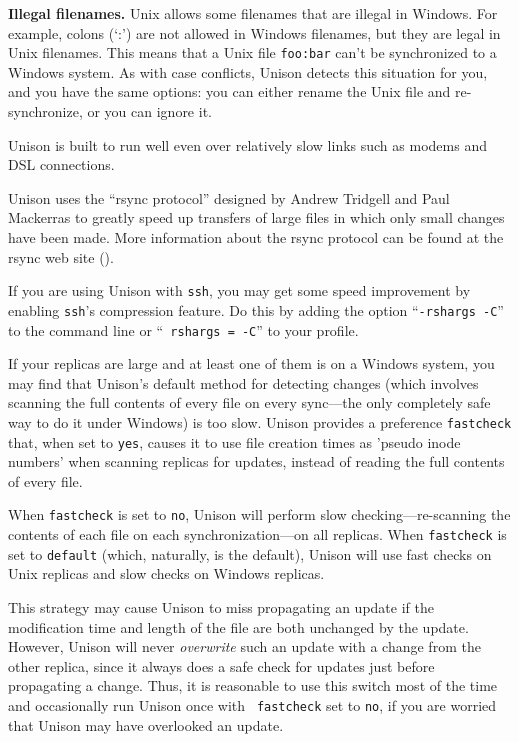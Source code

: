 \documentclass{article}
\begin{document}
\textbf{Illegal filenames.}  Unix allows some filenames that are
illegal in Windows.  For example, colons (`:') are not allowed in
Windows filenames, but they are legal in Unix filenames.  This means
that a Unix file \texttt{foo:bar} can't be synchronized to a Windows
system.  As with case conflicts, Unison detects this situation for
you, and you have the same options: you can either rename the Unix
file and re-synchronize, or you can ignore it.



Unison is built to run well even over relatively slow links such as
modems and DSL connections.  

Unison uses the ``rsync protocol'' designed by Andrew Tridgell and Paul
Mackerras to greatly speed up transfers of large files in which only
small changes have been made.  More information about the rsync protocol
can be found at the rsync web site ().

If you are using Unison with {\tt ssh}, you may get some speed
improvement by enabling {\tt ssh}'s compression feature.  Do this by
adding the option ``{\tt -rshargs -C}'' to the command line or ``{\tt
  rshargs = -C}'' to your profile.  



If your replicas are large and at least one of them is on a Windows
system, you may find that Unison's default method for detecting changes
(which involves scanning the full contents of every file on every
sync---the only completely safe way to do it under Windows) is too slow.
Unison provides a preference {\tt fastcheck} that, when set to
\verb|yes|, causes it to use file creation times as 'pseudo inode
numbers' when scanning replicas for updates, instead of reading the full
contents of every file.  

When \verb|fastcheck| is set to \verb|no|,
Unison will perform slow checking---re-scanning the contents of each file
on each synchronization---on all replicas.  When \verb|fastcheck| is set
to \verb|default| (which, naturally, is the default), Unison will use
fast checks on Unix replicas and slow checks on Windows replicas.

This strategy may cause Unison to miss propagating an update if the
 modification time and length of the file are both unchanged
by the update.
However, Unison will never {\em overwrite} such an update with a change
from the other replica, since it always does a safe check for updates
just before propagating a change.  Thus, it is reasonable to use this
switch most of the time and occasionally run Unison once with {\tt
  fastcheck} set to \verb|no|, if you are worried that Unison may have
overlooked an update.
\end{document}
